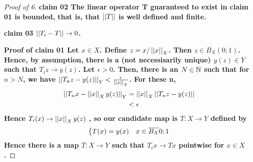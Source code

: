 \begin{prop}
\begin{proof}[Proof of 6]
    \bf claim 02 \rm The linear operator T guaranteed to exist in claim 01 is bounded, that is, 
    that $\left|\left| T \right|\right|$ is well defined and finite.

    \bf claim 03 \rm  $\left|\left| T_i-T \right|\right| \to 0$.


    \bf Proof of claim 01 \rm Let $x \in X$.
    Define $z=x/\left|\left| x \right|\right|_X$. 
    Then $z \in \overline{B_X}(0;1)$. 
    Hence, by assumption, there is a (not necessisarily unique)
    $y(z) \in Y$ such that 
    $T_iz \to y(z)$. 
    Let $\epsilon > 0$. 
    Then, there is an $N \in \mathbb{N}$ such that for $n>N$, we have
    $\left|\left| T_nz-y(z) \right|\right|_Y < \frac{\epsilon}{\left|\left| x \right|\right|_X}$. 
    For these n, 
    \begin{align*}
    \left|\left| T_nx-\left|\left| x \right|\right|_Xy(z) \right|\right|_Y & = \left|\left| x \right|\right|_X \left|\left| T_nz-y(z) \right|\right| \\
    & < \epsilon
    \end{align*}
    Hence $T_i(x) \to \left|\left| x \right|\right|_Xy(z)$
    , so our candidate map is $T:X \to Y$ defined by 
    \begin{equation*}
        \begin{dcases}
            T(x) = y(x)  & x \in \overline{B_X}0;1
        \end{dcases}
    \end{equation*}
    Hence there is a map $T:X \to Y$ such that $T_ix \to Tx$ pointwise for $x \in X$. 
\end{proof}

\end{prop}

